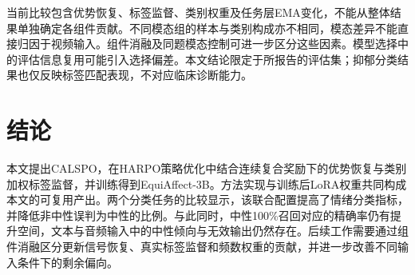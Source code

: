 \documentclass[UTF8,a4paper,11pt,fontset=windows]{ctexart}
\begin{document}
当前比较包含优势恢复、标签监督、类别权重及任务层EMA变化，不能从整体结果单独确定各组件贡献。不同模态组的样本与类别构成亦不相同，模态差异不能直接归因于视频输入。组件消融及同题模态控制可进一步区分这些因素。模型选择中的评估信息复用可能引入选择偏差\cite{ref23}。本文结论限定于所报告的评估集；抑郁分类结果也仅反映标签匹配表现，不对应临床诊断能力。

\section{结论}

本文提出CALSPO，在HARPO策略优化中结合连续复合奖励下的优势恢复与类别加权标签监督，并训练得到EquiAffect-3B。方法实现与训练后LoRA权重共同构成本文的可复用产出。两个分类任务的比较显示，该联合配置提高了情绪分类指标，并降低非中性误判为中性的比例。与此同时，中性100\%召回对应的精确率仍有提升空间，文本与音频输入中的中性倾向与无效输出仍然存在。后续工作需要通过组件消融区分更新信号恢复、真实标签监督和频数权重的贡献，并进一步改善不同输入条件下的剩余偏向。
\end{document}
